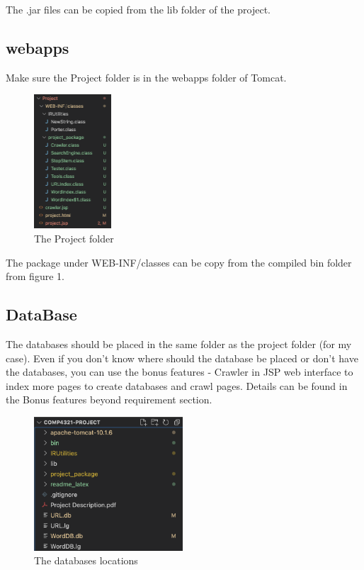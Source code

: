 \documentclass{article}
\begin{document}
        The .jar files can be copied from the lib folder of the project.
        \subsection*{webapps}
        Make sure the Project folder is in the webapps folder of Tomcat.
        \begin{figure}[!htbp]
            \centering
            \includegraphics[height=5cm]{webinf.png}
            \caption{The Project folder}
        \end{figure}

        The package under WEB-INF/classes can be copy from the compiled bin folder from figure 1. 

        \subsection*{DataBase}
        The databases should be placed in the same folder as the project folder (for my case).
        Even if you don't know where should the database be placed or don't have the databases, you can use the bonus features - Crawler in JSP web interface to index more pages to create databases and crawl pages. Details can be found in the Bonus features beyond requirement section.
        \begin{figure}[!htbp]
            \centering
            \includegraphics[height=5cm]{filesLocations.png}
            \caption{The databases locations}
        \end{figure}
\end{document}
